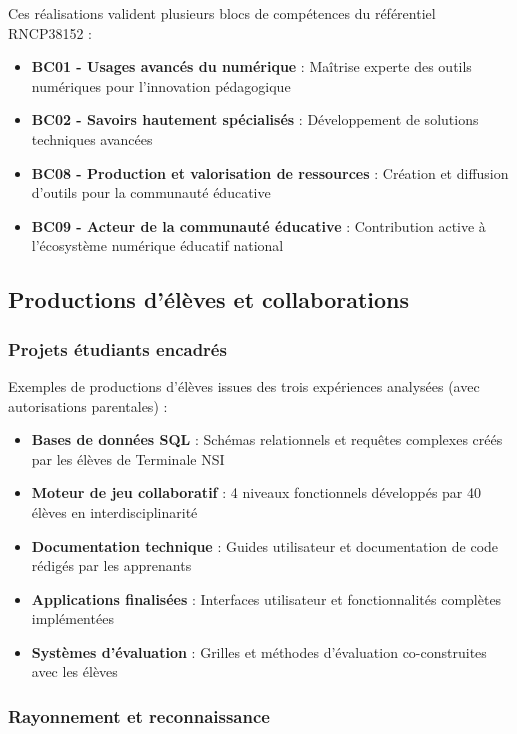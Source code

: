 Ces réalisations valident plusieurs blocs de compétences du référentiel RNCP38152 :

\begin{itemize}[leftmargin=*]
    \item \textbf{BC01 - Usages avancés du numérique} : Maîtrise experte des outils numériques pour l'innovation pédagogique
    \item \textbf{BC02 - Savoirs hautement spécialisés} : Développement de solutions techniques avancées
    \item \textbf{BC08 - Production et valorisation de ressources} : Création et diffusion d'outils pour la communauté éducative
    \item \textbf{BC09 - Acteur de la communauté éducative} : Contribution active à l'écosystème numérique éducatif national
\end{itemize}

\subsection{Productions d'élèves et collaborations}

\subsubsection{Projets étudiants encadrés}

Exemples de productions d'élèves issues des trois expériences analysées (avec autorisations parentales) :

\begin{itemize}[leftmargin=*]
    \item \textbf{Bases de données SQL} : Schémas relationnels et requêtes complexes créés par les élèves de Terminale NSI
    \item \textbf{Moteur de jeu collaboratif} : 4 niveaux fonctionnels développés par 40 élèves en interdisciplinarité
    \item \textbf{Documentation technique} : Guides utilisateur et documentation de code rédigés par les apprenants
    \item \textbf{Applications finalisées} : Interfaces utilisateur et fonctionnalités complètes implémentées
    \item \textbf{Systèmes d'évaluation} : Grilles et méthodes d'évaluation co-construites avec les élèves
\end{itemize}

\subsubsection{Rayonnement et reconnaissance}

